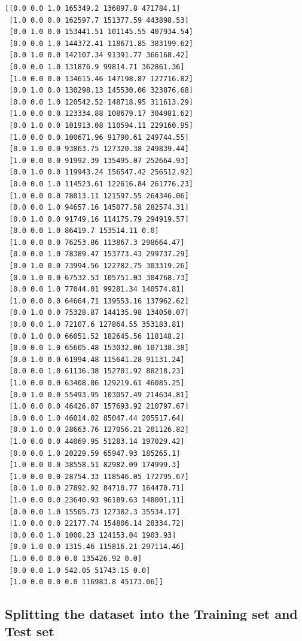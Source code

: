 \documentclass[11pt]{article}
\begin{document}
    \begin{Verbatim}[commandchars=\\\{\}]
[[0.0 0.0 1.0 165349.2 136897.8 471784.1]
 [1.0 0.0 0.0 162597.7 151377.59 443898.53]
 [0.0 1.0 0.0 153441.51 101145.55 407934.54]
 [0.0 0.0 1.0 144372.41 118671.85 383199.62]
 [0.0 1.0 0.0 142107.34 91391.77 366168.42]
 [0.0 0.0 1.0 131876.9 99814.71 362861.36]
 [1.0 0.0 0.0 134615.46 147198.87 127716.82]
 [0.0 1.0 0.0 130298.13 145530.06 323876.68]
 [0.0 0.0 1.0 120542.52 148718.95 311613.29]
 [1.0 0.0 0.0 123334.88 108679.17 304981.62]
 [0.0 1.0 0.0 101913.08 110594.11 229160.95]
 [1.0 0.0 0.0 100671.96 91790.61 249744.55]
 [0.0 1.0 0.0 93863.75 127320.38 249839.44]
 [1.0 0.0 0.0 91992.39 135495.07 252664.93]
 [0.0 1.0 0.0 119943.24 156547.42 256512.92]
 [0.0 0.0 1.0 114523.61 122616.84 261776.23]
 [1.0 0.0 0.0 78013.11 121597.55 264346.06]
 [0.0 0.0 1.0 94657.16 145077.58 282574.31]
 [0.0 1.0 0.0 91749.16 114175.79 294919.57]
 [0.0 0.0 1.0 86419.7 153514.11 0.0]
 [1.0 0.0 0.0 76253.86 113867.3 298664.47]
 [0.0 0.0 1.0 78389.47 153773.43 299737.29]
 [0.0 1.0 0.0 73994.56 122782.75 303319.26]
 [0.0 1.0 0.0 67532.53 105751.03 304768.73]
 [0.0 0.0 1.0 77044.01 99281.34 140574.81]
 [1.0 0.0 0.0 64664.71 139553.16 137962.62]
 [0.0 1.0 0.0 75328.87 144135.98 134050.07]
 [0.0 0.0 1.0 72107.6 127864.55 353183.81]
 [0.0 1.0 0.0 66051.52 182645.56 118148.2]
 [0.0 0.0 1.0 65605.48 153032.06 107138.38]
 [0.0 1.0 0.0 61994.48 115641.28 91131.24]
 [0.0 0.0 1.0 61136.38 152701.92 88218.23]
 [1.0 0.0 0.0 63408.86 129219.61 46085.25]
 [0.0 1.0 0.0 55493.95 103057.49 214634.81]
 [1.0 0.0 0.0 46426.07 157693.92 210797.67]
 [0.0 0.0 1.0 46014.02 85047.44 205517.64]
 [0.0 1.0 0.0 28663.76 127056.21 201126.82]
 [1.0 0.0 0.0 44069.95 51283.14 197029.42]
 [0.0 0.0 1.0 20229.59 65947.93 185265.1]
 [1.0 0.0 0.0 38558.51 82982.09 174999.3]
 [1.0 0.0 0.0 28754.33 118546.05 172795.67]
 [0.0 1.0 0.0 27892.92 84710.77 164470.71]
 [1.0 0.0 0.0 23640.93 96189.63 148001.11]
 [0.0 0.0 1.0 15505.73 127382.3 35534.17]
 [1.0 0.0 0.0 22177.74 154806.14 28334.72]
 [0.0 0.0 1.0 1000.23 124153.04 1903.93]
 [0.0 1.0 0.0 1315.46 115816.21 297114.46]
 [1.0 0.0 0.0 0.0 135426.92 0.0]
 [0.0 0.0 1.0 542.05 51743.15 0.0]
 [1.0 0.0 0.0 0.0 116983.8 45173.06]]
    \end{Verbatim}

    \subsection{Splitting the dataset into the Training set and Test
set}\label{splitting-the-dataset-into-the-training-set-and-test-set}
\end{document}
